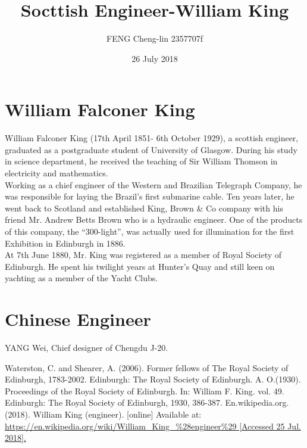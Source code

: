 \documentclass{article}
\title{Socttish Engineer-William King}
\author {FENG Cheng-lin 2357707f\\}
\date{26 July 2018}
\begin{document}
\maketitle
\begin{spacing}{2.0}
\linespread{2}

\section{William Falconer King}
William Falconer King (17th April 1851- 6th October 1929), a scottish engineer, graduated as a postgraduate student of University of Glasgow. During his study in science department, he received the teaching of Sir William Thomson in electricity and mathematics.\\

\noindent Working as a chief engineer of the Western and Brazilian Telegraph Company, he was responsible for laying the Brazil's first submarine cable. Ten years later, he went back to Scotland and established King, Brown \& Co company with his friend Mr. Andrew Betts Brown who is a hydraulic engineer. One of the products of this company, the “300-light”, was actually used for illumination for the first Exhibition in Edinburgh in 1886.\\

\noindent At 7th June 1880, Mr. King was registered as a member of Royal Society of Edinburgh.\cite{bibitem1} He spent his twilight years at Hunter’s Quay and still keen on yachting as a member of the Yacht Clubs.

\section{Chinese Engineer}
YANG Wei, Chief designer of Chengdu J-20.


\begin{thebibliography}{10}
Waterston, C. and Shearer, A. (2006). Former fellows of The Royal Society of Edinburgh, 1783-2002. Edinburgh: The Royal Society of Edinburgh. 
A. O.(1930). Proceedings of the Royal Society of Edinburgh. In: William F. King. vol. 49. Edinburgh: The Royal Society of Edinburgh, 1930, 386-387. 
En.wikipedia.org. (2018). William King (engineer). [online] Available at: \url{https://en.wikipedia.org/wiki/William_King_%28engineer%29 [Accessed 25 Jul. 2018].} 
\end{thebibliography}

\end{spacing}
\end{document}

